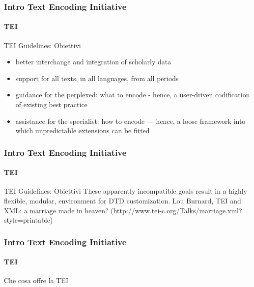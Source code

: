 \begin{frame}
	\frametitle{Intro Text Encoding Initiative}
	\framesubtitle{TEI}
	\addtocounter{nframe}{1}

	\begin{block}{TEI Guidelines: Obiettivi}
		\begin{itemize}
			\item better interchange and integration of scholarly data
			\item support for all texts, in all languages, from all periods
			\item guidance for the perplexed: what to encode - hence, a user-driven codification of existing best practice
			\item assistance for the specialist: how to encode --- hence, a loose framework into which unpredictable extensions can be fitted
		\end{itemize}
	\end{block}

\end{frame}



\begin{frame}
	\frametitle{Intro Text Encoding Initiative}
	\framesubtitle{TEI}
	\addtocounter{nframe}{1}

	\begin{block}{TEI Guidelines: Obiettivi}
		These apparently incompatible goals result in a highly flexible,
		modular, environment for DTD customization.
		Lou Burnard, TEI and XML: a marriage made in heaven?
		(http://www.tei-c.org/Talks/marriage.xml?style=printable)
	\end{block}

\end{frame}


\begin{frame}
	\frametitle{Intro Text Encoding Initiative}
	\framesubtitle{TEI}
	\addtocounter{nframe}{1}

	\begin{block}{Che cosa offre la TEI}

	\end{block}

\end{frame}

